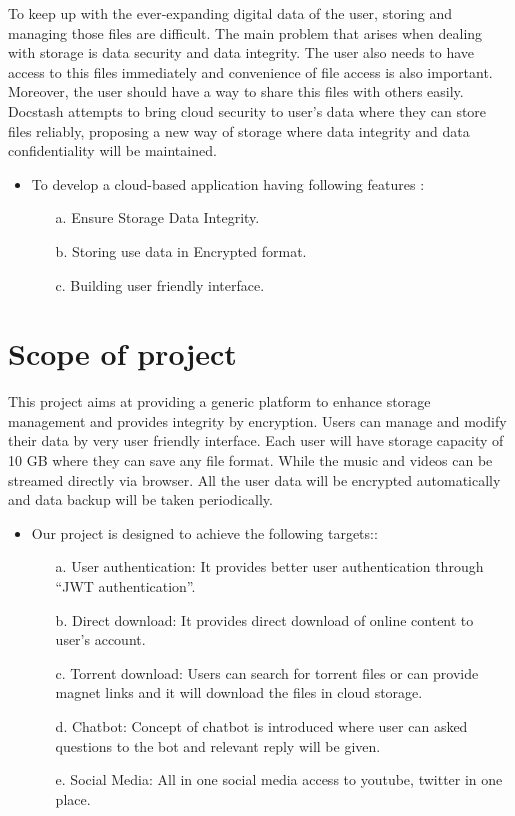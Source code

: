 \hspace{0.6cm}  To keep up with the ever-expanding digital data of the user, storing and managing those files are difficult. The main problem that arises when dealing with storage is data security and data integrity. The user also needs to have access to this files immediately and convenience of file access is also important. Moreover, the user should have a way to share this files with others easily. Docstash attempts to bring cloud security to user’s data where they can store files reliably, proposing a new way of storage where data integrity and data confidentiality will be maintained.
\begin{itemize}
\item To develop a cloud-based application having following features :
    \begin{itemize}
    \item[a.] Ensure Storage Data Integrity.

    \item[b.] Storing use data in Encrypted format.

    \item[c.] Building user friendly interface.
    \end{itemize}
\end{itemize}


\section{Scope of project}

\hspace{0.6cm}This project aims at providing a generic platform to enhance storage management and provides integrity by encryption. Users can manage and modify their data by very user friendly interface. Each user will have storage capacity of 10 GB where they can save any file format. While the music and videos can be streamed directly via browser. All the user data will be encrypted automatically and data backup will be taken periodically.

\begin{itemize}
\item Our project is designed to achieve the following targets::
    \begin{itemize}
    \item[a.] User authentication:  It provides better user authentication through “JWT authentication”.

    \item[b.] Direct download:  It provides direct download of online content to user’s account. 

    \item[c.] Torrent download: Users can search for torrent files or can provide magnet links and it will download the files in cloud storage.
    \item[d.] Chatbot: Concept of chatbot is introduced where user can asked questions to the bot and relevant reply will be given.
    \item[e.] Social Media: All in one social media access to youtube, twitter in one place.
    \end{itemize}
\end{itemize}

